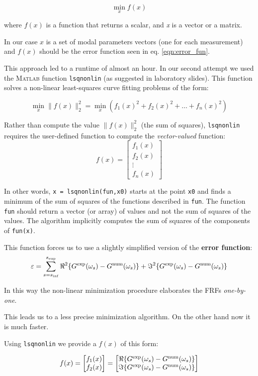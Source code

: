 \documentclass[a4paper,12pt,oneside]{article}
\begin{document}
\[
\min_x f(x)
\]

where $f(x)$ is a function that returns a scalar, and \textit{x} is a vector or a matrix. 

In our case $x$ is a set of modal parameters vectors (one for each measurement) and $f(x)$ should be the error function seen in eq. \ref{eqn:error_fun}.

This approach led to a runtime of almost an hour. 
In our second attempt we used the \textsc{Matlab} function \texttt{lsqnonlin} (as suggested in laboratory slides). This function solves a non-linear least-squares curve fitting problems of the form:

\[
\min_x \parallel f(x) \parallel _2^2 =
\min_x \left( f_1 (x)^2 + f_2(x)^2 + \ldots + f_n (x)^2 \right) 
\]

Rather than compute the value $\parallel f(x) \parallel _2^2 $
 (the sum of squares), \texttt{lsqnonlin} requires the user-defined function to compute the \textit{vector-valued} function:
\[
f(x) = 
\begin{bmatrix} f_1 (x) \\ f_2 (x) \\ \vdots \\ f_n (x) \end{bmatrix}
\]

In other words, \texttt{x = lsqnonlin(fun,x0)} starts at the point \texttt{x0} and finds a minimum of the sum of squares of the functions described in \texttt{fun}. The function \texttt{fun} should return a vector (or array) of values and not the sum of squares of the values. The algorithm implicitly computes the sum of squares of the components of \texttt{fun(x)}.

This function forces us to use a slightly simplified version of the \textbf{error function}:
\begin{equation}
\label{eqn:error_fun2} 
	\varepsilon = \sum_{s=s_\textup{inf}}^{s_\textup{sup}}
		\Re^2\{G^\textup{exp}(\omega_s) - G^\textup{num}(\omega_s)\} +
		\Im^2\{G^\textup{exp}(\omega_s) - G^\textup{num}(\omega_s)\}
\end{equation}

In this way the non-linear minimization procedure elaborates the FRFs \textsl{one-by-one}.

This leads us to a less precise minimization algorithm. On the other hand now it is much faster. 

Using \texttt{lsqnonlin} we provide a $f(x)$ of this form:

\[
f(x) = 
\begin{bmatrix} f_1 (x) \\ f_2 (x)  \end{bmatrix} =
\begin{bmatrix} 
\Re\{G^\textup{exp}(\omega_s) - G^\textup{num}(\omega_s)\}
\\ \Im\{G^\textup{exp}(\omega_s) - G^\textup{num}(\omega_s)\}  
\end{bmatrix}
\]
\end{document}
